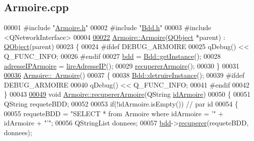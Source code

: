 \hypertarget{_armoire_8cpp_source}{}\subsection{Armoire.\+cpp}
\label{_armoire_8cpp_source}

\begin{DoxyCode}
00001 \textcolor{preprocessor}{#include "\hyperlink{_armoire_8h}{Armoire.h}"}
00002 \textcolor{preprocessor}{#include "\hyperlink{_bdd_8h}{Bdd.h}"}
00003 \textcolor{preprocessor}{#include <QNetworkInterface>}
00004 
\hyperlink{class_armoire_a5db260c682a9d2688afc0efbd5be8d14}{00022} \hyperlink{class_armoire_a5db260c682a9d2688afc0efbd5be8d14}{Armoire::Armoire}(\hyperlink{class_q_object}{QObject} *parent) : \hyperlink{class_q_object}{QObject}(parent)
00023 \{
00024 \textcolor{preprocessor}{    #ifdef DEBUG\_ARMOIRE}
00025         qDebug() << Q\_FUNC\_INFO;
00026 \textcolor{preprocessor}{    #endif}
00027     \hyperlink{class_armoire_a555f656018e7b600987128cdc792e320}{bdd} = \hyperlink{class_bdd_a6f55c29d593da12ca31fad02f5adfe24}{Bdd::getInstance}();
00028     \hyperlink{class_armoire_ab96bd042aa78eaefba0aefb860684ca6}{adresseIPArmoire} = \hyperlink{class_armoire_abc30649cc7d4f3c0cefcc54894aeb406}{lireAdresseIP}();
00029     \hyperlink{class_armoire_a1c5266f9e4b01c0d2e1d244d2f11fffd}{recupererArmoire}();
00030 \}
00031 
\hyperlink{class_armoire_a0f506a879391a987f12f59a23f60634e}{00036} \hyperlink{class_armoire_a0f506a879391a987f12f59a23f60634e}{Armoire::~Armoire}()
00037 \{
00038     \hyperlink{class_bdd_af89fa3ffa107c7859a3964bf032cfdb7}{Bdd::detruireInstance}();
00039 \textcolor{preprocessor}{    #ifdef DEBUG\_ARMOIRE}
00040         qDebug() << Q\_FUNC\_INFO;
00041 \textcolor{preprocessor}{    #endif}
00042 \}
00043 
\hyperlink{class_armoire_a1c5266f9e4b01c0d2e1d244d2f11fffd}{00049} \textcolor{keywordtype}{void} \hyperlink{class_armoire_a1c5266f9e4b01c0d2e1d244d2f11fffd}{Armoire::recupererArmoire}(QString \hyperlink{class_armoire_a131caceb7d4b90cb7761851757e80f57}{idArmoire})
00050 \{
00051     QString requeteBDD;
00052 
00053     \textcolor{keywordflow}{if}(!idArmoire.isEmpty()) \textcolor{comment}{// par id}
00054     \{
00055         requeteBDD = \textcolor{stringliteral}{"SELECT * from Armoire where idArmoire = '"} + idArmoire + \textcolor{stringliteral}{"'"};
00056         QStringList donnees;
00057         \hyperlink{class_armoire_a555f656018e7b600987128cdc792e320}{bdd}->\hyperlink{class_bdd_a8f25d29d309041bbf875700db0efd97b}{recuperer}(requeteBDD, donnees);

\end{DoxyCode}
